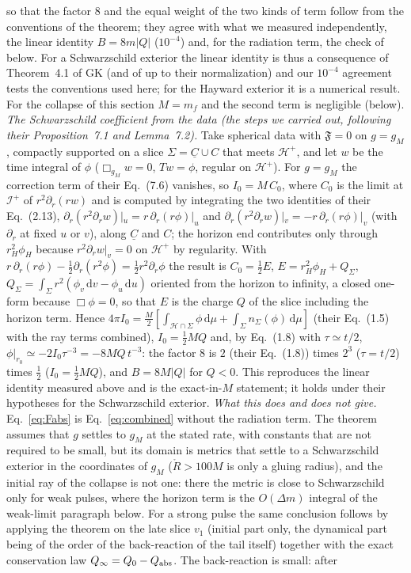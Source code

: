 \documentclass[11pt]{article}
\begin{document}
so that the factor $8$ and the equal weight of the two kinds of term follow from the conventions of the theorem; they agree with what we measured independently, the linear identity $B=8m|Q|$ ($10^{-4}$) and, for the radiation term, the check of \citet{BizonChmajRostworowski2008} below. For a Schwarzschild exterior the linear identity is thus a consequence of Theorem~4.1 of GK (and of \citet{AngelopoulosAretakisGajic2018} up to their normalization) and our $10^{-4}$ agreement tests the conventions used here; for the Hayward exterior it is a numerical result. For the collapse of this section $M=m_f$ and the second term is negligible (below). \emph{The Schwarzschild coefficient from the data (the steps we carried out, following their Proposition~7.1 and Lemma~7.2).} Take spherical data with $\mathfrak F=0$ on $g=g_M$, compactly supported on a slice $\Sigma=\underline C\cup C$ that meets $\mathcal H^{+}$, and let $w$ be the time integral of $\phi$ ($\Box_{g_M}w=0$, $Tw=\phi$, regular on $\mathcal H^{+}$). For $g=g_M$ the correction term of their Eq.~(7.6) vanishes, so $I_0=M\,C_0$, where $C_0$ is the limit at $\mathcal I^{+}$ of $r^{2}\partial_r(rw)$ and is computed by integrating the two identities of their Eq.~(2.13), $\partial_r(r^{2}\partial_r w)|_u=r\,\partial_r(r\phi)|_u$ and $\partial_r(r^{2}\partial_r w)|_v=-r\,\partial_r(r\phi)|_v$ (with $\partial_r$ at fixed $u$ or $v$), along $\underline C$ and $C$; the horizon end contributes only through $r_H^{2}\phi_H$ because $r^{2}\partial_r w|_v=0$ on $\mathcal H^{+}$ by regularity. With $r\,\partial_r(r\phi)-\tfrac12\partial_r(r^{2}\phi)=\tfrac12 r^{2}\partial_r\phi$ the result is $C_0=\tfrac12E$, $E=r_H^{2}\phi_H+Q_\Sigma$, $Q_\Sigma=\int_\Sigma r^{2}(\phi_v\,\mathrm dv-\phi_u\,\mathrm du)$ oriented from the horizon to infinity, a closed one-form because $\Box\phi=0$, so that $E$ is the charge $Q$ of the slice including the horizon term. Hence $4\pi I_0=\tfrac M2[\int_{\mathcal H\cap\Sigma}\phi\,\mathrm d\mu+\int_\Sigma n_\Sigma(\phi)\,\mathrm d\mu]$ (their Eq.~(1.5) with the ray terms combined), $I_0=\tfrac12MQ$ and, by Eq.~(1.8) with $\tau\simeq t/2$, $\phi|_{r_0}\simeq-2I_0\tau^{-3}=-8MQ\,t^{-3}$: the factor $8$ is $2$ (their Eq.~(1.8)) times $2^{3}$ ($\tau=t/2$) times $\tfrac12$ ($I_0=\tfrac12MQ$), and $B=8M|Q|$ for $Q<0$. This reproduces the linear identity measured above and is the exact-in-$M$ statement; it holds under their hypotheses for the Schwarzschild exterior. \emph{What this does and does not give.} Eq.~\eqref{eq:Fabs} is Eq.~\eqref{eq:combined} without the radiation term. The theorem assumes that $g$ settles to $g_M$ at the stated rate, with constants that are not required to be small, but its domain is metrics that settle to a Schwarzschild exterior in the coordinates of $g_M$ ($\mathring R>100M$ is only a gluing radius), and the initial ray of the collapse is not one: there the metric is close to Schwarzschild only for weak pulses, where the horizon term is the $O(\Delta m)$ integral of the weak-limit paragraph below. For a strong pulse the same conclusion follows by applying the theorem on the late slice $v_1$ (initial part only, the dynamical part being of the order of the back-reaction of the tail itself) together with the exact conservation law $Q_\infty=Q_0-Q_{\rm abs}$. The back-reaction is small: after 
\end{document}
